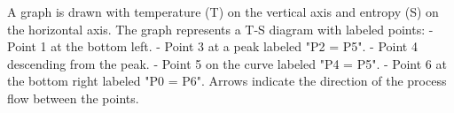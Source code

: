 A graph is drawn with temperature (T) on the vertical axis and entropy (S) on the horizontal axis. The graph represents a T-S diagram with labeled points:  
- Point 1 at the bottom left.  
- Point 3 at a peak labeled "P2 = P5".  
- Point 4 descending from the peak.  
- Point 5 on the curve labeled "P4 = P5".  
- Point 6 at the bottom right labeled "P0 = P6".  
Arrows indicate the direction of the process flow between the points.